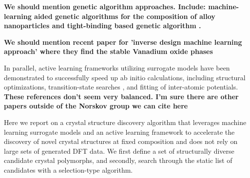 \textbf{We should mention genetic algorithm approaches. Include: machine-learning aided genetic algorithms for the composition of alloy nanoparticles \cite{Jennings2019} and tight-binding based genetic algorithm \cite{VanDenBossche2018}.}


\textbf{We should mention recent paper for 'inverse design machine learning approach' where they find the stable Vanadium oxide phases \cite{noh2019inverse}}

In parallel, active learning frameworks utilizing surrogate models have been demonstrated to successfully speed up ab initio calculations, including structural optimizations\cite{hansen2019atomistic}, transition-state searches \cite{torres2019low}, and fitting of inter-atomic potentials. \cite{podryabinkin2017active}
\textbf{These references don't seem very balanced. I'm sure there are other papers outside of the Norskov group we can cite here}

%


Here we report on a crystal structure discovery algorithm that leverages machine learning surrogate models and an active learning framework to accelerate the discovery of novel crystal structures at fixed composition and does not rely on large sets of generated DFT data.
%
%
%
We first define a set of structurally diverse candidate crystal polymorphs, and secondly, search through the static list of candidates with a selection-type algorithm.
%
%
%

